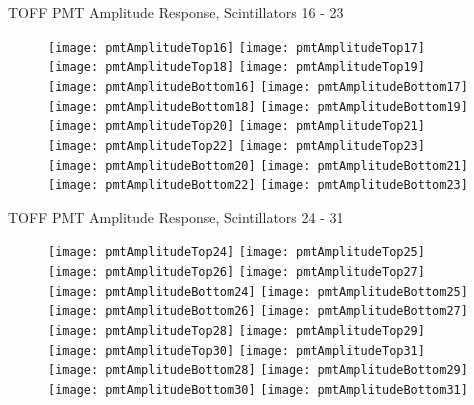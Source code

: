 \documentclass[11pt]{beamer}
\begin{document}
\begin{frame}{TOFF PMT Amplitude Response, Scintillators 16 - 23}
\begin{figure}
\centering
\texttt{[image: pmtAmplitudeTop16]}
\texttt{[image: pmtAmplitudeTop17]}
\texttt{[image: pmtAmplitudeTop18]}
\texttt{[image: pmtAmplitudeTop19]} \\ 
\texttt{[image: pmtAmplitudeBottom16]}
\texttt{[image: pmtAmplitudeBottom17]}
\texttt{[image: pmtAmplitudeBottom18]}
\texttt{[image: pmtAmplitudeBottom19]} \\
\texttt{[image: pmtAmplitudeTop20]}
\texttt{[image: pmtAmplitudeTop21]}
\texttt{[image: pmtAmplitudeTop22]}
\texttt{[image: pmtAmplitudeTop23]} \\
\texttt{[image: pmtAmplitudeBottom20]}
\texttt{[image: pmtAmplitudeBottom21]}
\texttt{[image: pmtAmplitudeBottom22]}
\texttt{[image: pmtAmplitudeBottom23]} \\
\end{figure}
\end{frame}

\begin{frame}{TOFF PMT Amplitude Response, Scintillators 24 - 31}
\begin{figure}
\centering
\texttt{[image: pmtAmplitudeTop24]}
\texttt{[image: pmtAmplitudeTop25]}
\texttt{[image: pmtAmplitudeTop26]}
\texttt{[image: pmtAmplitudeTop27]} \\ 
\texttt{[image: pmtAmplitudeBottom24]}
\texttt{[image: pmtAmplitudeBottom25]}
\texttt{[image: pmtAmplitudeBottom26]}
\texttt{[image: pmtAmplitudeBottom27]} \\
\texttt{[image: pmtAmplitudeTop28]}
\texttt{[image: pmtAmplitudeTop29]}
\texttt{[image: pmtAmplitudeTop30]}
\texttt{[image: pmtAmplitudeTop31]} \\
\texttt{[image: pmtAmplitudeBottom28]}
\texttt{[image: pmtAmplitudeBottom29]}
\texttt{[image: pmtAmplitudeBottom30]}
\texttt{[image: pmtAmplitudeBottom31]} \\
\end{figure}
\end{frame}
\end{document}
